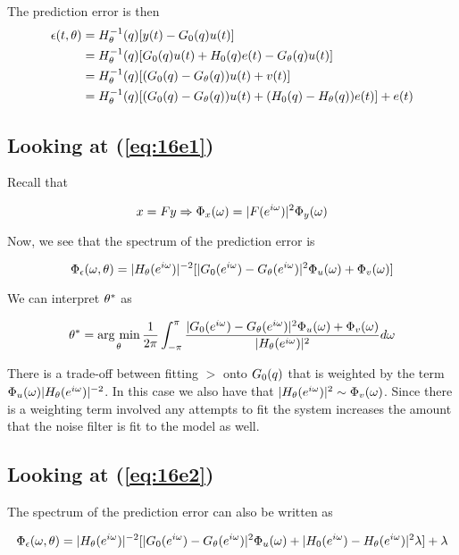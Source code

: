 The prediction error is then
\begin{align}
\epsilon(t,\theta) &= H_\theta^{-1} (q)[y(t)-G_0(q) u(t)] \nonumber \\
&= H_\theta^{-1} (q)[G_0(q) u(t)+H_0(q) e(t)-G_\theta(q) u(t)] \nonumber \\
\label{eq:16e1}
&= H_\theta^{-1} (q)[(G_0(q)-G_\theta(q))u(t)+v(t)] \\
\label{eq:16e2}
&= H_\theta^{-1} (q) [ (G_0(q) - G_\theta(q)) u(t) + (H_0(q) - H_\theta(q)) e(t) ] + e(t)
\end{align}

\subsection{Looking at (\ref{eq:16e1})}
Recall that

\begin{equation*}
x=Fy \Rightarrow \Phi_x(\omega)=|F(e^{i\omega})|^2\Phi_y(\omega)
\end{equation*}

Now, we see that the spectrum of the prediction error is

\begin{equation*}
\Phi_\epsilon(\omega,\theta) = |H_\theta(e^{i\omega})|^{-2}[|G_0(e^{i\omega})-G_\theta(e^{i\omega})|^2\Phi_u(\omega) + \Phi_v(\omega)]
\end{equation*}

We can interpret $\theta^\ast$ as

\begin{equation*}
\theta^\ast = \mathop{\arg\,\min}\limits_\theta \frac{1}{2\pi} \int_{-\pi}^\pi \frac{|G_0(e^{i\omega})-G_\theta(e^{i\omega})|^2\Phi_u(\omega)+\Phi_v(\omega)}{|H_\theta(e^{i\omega})|^2}d\omega
\end{equation*}

There is a trade-off between fitting $\gt$ onto $G_0(q)$ that is weighted by the term $\Phi_u(\omega)|H_\theta(e^{i\omega})|^{-2}$.
In this case we also have that $|H_\theta(e^{i\omega})|^2\sim\Phi_v(\omega)$.
Since there is a weighting term involved any attempts to fit the system increases the amount that the noise filter is fit to the model as well.

\subsection{Looking at (\ref{eq:16e2})}
The spectrum of the prediction error can also be written as

\begin{equation*}
\Phi_\epsilon(\omega,\theta) = |H_\theta(e^{i\omega})|^{-2}[|G_0(e^{i\omega})-G_\theta(e^{i\omega})|^2\Phi_u(\omega)+|H_0(e^{i\omega})-H_\theta(e^{i\omega})|^2\lambda]+\lambda
\end{equation*}

